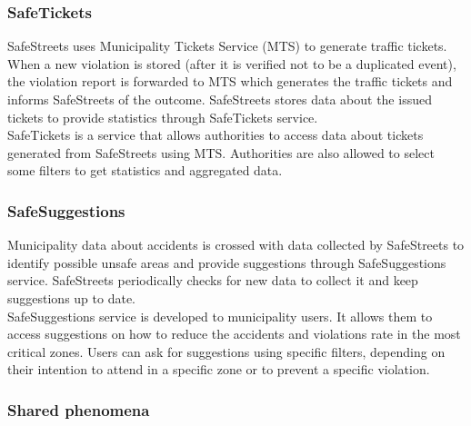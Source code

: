 \documentclass[a4paper]{article}
\begin{document}
\subsubsection{SafeTickets}

SafeStreets uses Municipality Tickets Service (MTS) to generate traffic
tickets. When a new violation is stored (after it is verified not to be
a duplicated event), the violation report is forwarded to MTS which
generates the traffic tickets and informs SafeStreets of the outcome.
SafeStreets stores data about the issued tickets to provide statistics
through SafeTickets service.\\
SafeTickets is a service that allows authorities to access data about
tickets generated from SafeStreets using MTS. Authorities are also
allowed to select some filters to get statistics and aggregated data.

\subsubsection{SafeSuggestions}

Municipality data about accidents is crossed with data collected by
SafeStreets to identify possible unsafe areas and provide suggestions
through SafeSuggestions service. SafeStreets periodically checks for new
data to collect it and keep suggestions up to date.\\
SafeSuggestions service is developed to municipality users. It allows
them to access suggestions on how to reduce the accidents and violations
rate in the most critical zones. Users can ask for suggestions using
specific filters, depending on their intention to attend in a specific
zone or to prevent a specific violation.

\subsubsection{Shared phenomena}
\end{document}
